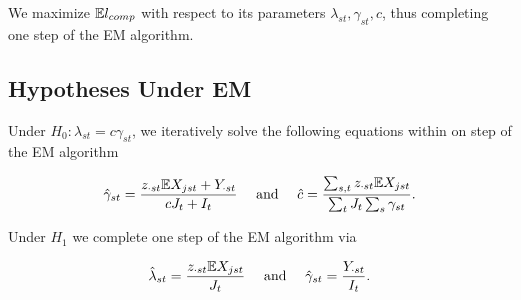\documentclass[12pt]{article}\usepackage[]{graphicx}\usepackage[]{color}
\begin{document}
We maximize $\mathbb{E} l_{comp}$ with respect to its parameters $\lambda_{st}, \gamma_{st}, c$, thus completing one step of the EM algorithm. 

\subsection*{Hypotheses Under EM}

Under $H_0: \lambda_{st} = c \gamma_{st}$, we iteratively solve the following equations within on step of the EM algorithm

\begin{equation*}
  \hat{\gamma}_{st} = \frac{z_{\cdot st} \mathbb{E} X_{jst} + Y_{\cdot st}}{cJ_t + I_t} \quad \text{ and } \quad \hat{c} = \frac{ \sum_{s,t} z_{\cdot st} \mathbb{E} X_{jst}}{\sum_{t} J_t \sum_{s} \gamma_{st}}.
\end{equation*}

Under $H_1$ we complete one step of the EM algorithm via

\begin{equation*}
  \hat{\lambda}_{st} = \frac{z_{\cdot st} \mathbb{E} X_{jst}}{J_t} \quad \text{ and } \quad \hat{\gamma}_{st} = \frac{Y_{\cdot st}}{I_t}.
\end{equation*}



\end{document}
